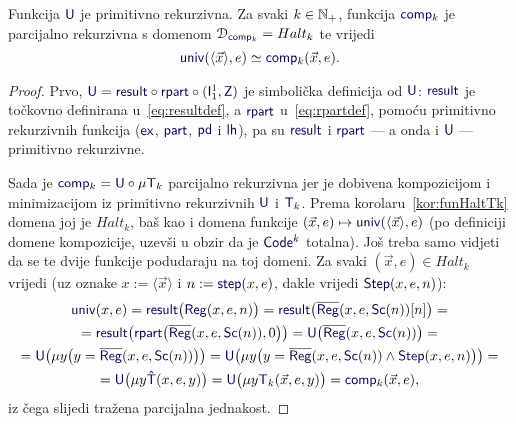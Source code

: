 \begin{propozicija}[{name=[parcijalna rekurzivnost univerzalnih funkcija dane mjesnosti]}]\label{prop:compspec}
Funkcija $\f U$ je primitivno rekurzivna. Za svaki $k\in{\mathbb N}_+$, funkcija $\f{comp}_k$ je parcijalno rekurzivna s domenom $\dom{\f{comp}_k}=Halt_k$ te vrijedi \begin{equation}\label{eq:comp=univ}
    \f{univ}(\langle\vec x\rangle,e)\simeq\f{comp}_k(\vec x,e)\text.
\end{equation}
\end{propozicija}
\begin{proof}
Prvo, $\f U=\f{result}\circ\f{rpart}\circ(\f I_1^1,\f Z)$ je simbolička definicija od $\f U$: $\f{result}$ je točkovno definirana u~\eqref{eq:resultdef}, a $\f{rpart}$ u~\eqref{eq:rpartdef}, pomoću primitivno rekurzivnih funkcija ($\f{ex}$, $\f{part}$, $\f{pd}$ i $\f{lh}$), pa su $\f{result}$ i $\f{rpart}$ --- a onda i $\f U$ --- primitivno rekurzivne.

Sada je $\f{comp}_k=\f U\circ\mu\f T_k$ parcijalno rekurzivna jer je dobivena kompozicijom i minimizacijom iz primitivno rekurzivnih $\f U$ i $\f T_k$. Prema korolaru~\ref{kor:funHaltTk} domena joj je $Halt_k$, baš kao i domena funkcije $(\vec x,e)\mapsto\f{univ}(\langle\vec x\rangle,e)$ (po definiciji domene kompozicije, uzevši u obzir da je $\f{Code}^k$ totalna). Još treba samo vidjeti da se te dvije funkcije podudaraju na toj domeni. Za svaki $(\vec x,e)\in Halt_k$ vrijedi (uz oznake $x:=\langle\vec x\rangle$ i $n:=\f{step}(x,e)$, dakle vrijedi $\f{Step}(x,e,n)$):
\begin{multline}
    \f{univ}(x,e)=
    \f{result}\bigl(\f{Reg}(x,e,n)\bigr)=
    \f{result}\bigl(\overline{\f{Reg}}(x,e,\f{Sc}(n))[n]\bigr)=\\
    =
    \f{result}\bigl(\f{rpart}\bigl(\overline{\f{Reg}}(x,e,\f{Sc}(n)),0\bigr)\bigr)=
    \f U\bigl(\overline{\f{Reg}}(x,e,\f{Sc}(n))\bigr)
    =\\
    =\f U\bigl(\mu y\bigl(y=\overline{\f{Reg}}(x,e,\f{Sc}(n))\bigr)\bigr)=
    \f U\bigl(\mu y\bigl(y=\overline{\f{Reg}}(x,e,\f{Sc}(n))\land\f{Step}(x,e,n)\bigr)\bigr)=\\
    =\f U\bigl(\mu y\f{\hat T}(x,e,y)\bigr)=
    \f U\bigl(\mu y\f T_k(\vec x,e,y)\bigr)=
    \f{comp}_k(\vec x,e)\text,
\end{multline}
iz čega slijedi tražena parcijalna jednakost.
\end{proof}

